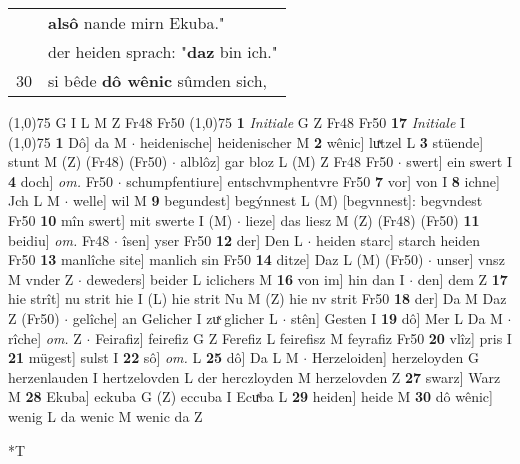 \documentclass[8pt,a4paper,notitlepage]{article}
\begin{document}
\begin{table}[ht]
\begin{minipage}[t]{0.5\linewidth}
\begin{tabular}{rl}
 & \textbf{alsô} nande mirn Ekuba."\\ 
 & der heiden sprach: "\textbf{daz} bin ich."\\ 
30 & si bêde \textbf{dô wênic} sûmden sich,\\ 
\end{tabular}
\scriptsize
\line(1,0){75} \newline
G I L M Z Fr48 Fr50 \newline
\line(1,0){75} \newline
\textbf{1} \textit{Initiale} G Z Fr48 Fr50  \textbf{17} \textit{Initiale} I  \newline
\line(1,0){75} \newline
\textbf{1} Dô] da M  $\cdot$ heidenische] heidenischer M \textbf{2} wênic] luͯtzel L \textbf{3} stüende] stunt M (Z) (Fr48) (Fr50)  $\cdot$ alblôz] gar bloz L (M) Z Fr48 Fr50  $\cdot$ swert] ein swert I \textbf{4} doch] \textit{om.} Fr50  $\cdot$ schumpfentiure] entschvmphentvre Fr50 \textbf{7} vor] von I \textbf{8} ichne] Jch L M  $\cdot$ welle] wil M \textbf{9} begundest] begýnnest L (M) [begvnnest]: begvndest  Fr50 \textbf{10} mîn swert] mit swerte I (M)  $\cdot$ lieze] das liesz M (Z) (Fr48) (Fr50) \textbf{11} beidiu] \textit{om.} Fr48  $\cdot$ îsen] yser Fr50 \textbf{12} der] Den L  $\cdot$ heiden starc] starch heiden Fr50 \textbf{13} manlîche site] manlich sin Fr50 \textbf{14} ditze] Daz L (M) (Fr50)  $\cdot$ unser] vnsz M vnder Z  $\cdot$ deweders] beider L iclichers M \textbf{16} von im] hin dan I  $\cdot$ den] dem Z \textbf{17} hie strît] nu strit hie I (L) hie strit Nu M (Z) hie nv strit Fr50 \textbf{18} der] Da M Daz Z (Fr50)  $\cdot$ gelîche] an Gelicher I zuͯ glicher L  $\cdot$ stên] Gesten I \textbf{19} dô] Mer L Da M  $\cdot$ rîche] \textit{om.} Z  $\cdot$ Feirafiz] feirefiz G Z Ferefiz L feirefisz M feyrafiz Fr50 \textbf{20} vlîz] pris I \textbf{21} mügest] sulst I \textbf{22} sô] \textit{om.} L \textbf{25} dô] Da L M  $\cdot$ Herzeloiden] herzeloyden G herzenlauden I hertzelovden L der herczloyden M herzelovden Z \textbf{27} swarz] Warz M \textbf{28} Ekuba] eckuba G (Z) eccuba I Ecuͯba L \textbf{29} heiden] heide M \textbf{30} dô wênic] wenig L da wenic M wenic da Z \newline
\end{minipage}
\hspace{0.5cm}
\begin{minipage}[t]{0.5\linewidth}
\small
\begin{center}*T
\end{center}
\begin{tabular}{rl}

\end{tabular}
\end{minipage}
\end{table}
\end{document}
